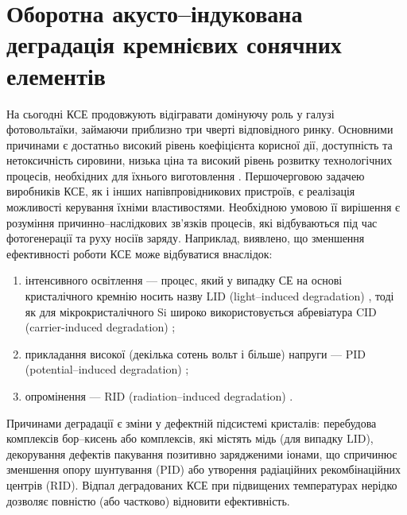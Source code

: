 \section{Оборотна акусто--індукована деградація кремнієвих сонячних \mbox{елементів}\label{USID}}

На сьогодні КСЕ продовжують відігравати домінуючу роль у галузі фотовольтаїки, займаючи приблизно три чверті відповідного ринку.
Основними причинами є достатньо високий рівень коефіцієнта корисної дії, доступність та нетоксичність сировини,
низька ціна та високий рівень розвитку технологічних процесів, необхідних для їхнього виготовлення \cite{Si:Hu}.
Першочерговою задачею виробників КСЕ, як і інших напівпровідникових пристроїв, є реалізація можливості керування їхніми властивостями.
Необхідною умовою її вирішення є розуміння причинно--наслідкових зв'язків процесів, які відбуваються під час фотогенерації та руху носіїв заряду.
Наприклад, виявлено, що зменшення ефективності роботи КСЕ може відбуватися внаслідок:
\begin{enumerate}[label=\asbuk*),leftmargin=0em,itemindent=1.5em]
  \item інтенсивного освітлення --- процес, який у випадку СЕ на основі кристалічного кремнію носить назву LID (light--induced degradation) \cite{LID:SchmidtJMR,LIDRev,LIDRev2,LID:JAP2017II}, тоді як для мікрокристалічного Si широко використовується абревіатура CID (carrier-induced degradation) \cite{CID:APL,CID:PPS};
  \item прикладання високої (декілька сотень вольт і більше) напруги --- PID  (potential--induced degradation) \cite{PID:SEMSC,PID:PP,PID:2017};
  \item опромінення ---  RID (radiation--induced degradation) \cite{Bhat,Karazhanov}.
\end{enumerate}
Причинами деградації є зміни у дефектній підсистемі кристалів:
перебудова комплексів бор--кисень або комплексів, які містять мідь (для випадку LID),
декорування дефектів пакування позитивно зарядженими іонами, що спричинює зменшення  опору шунтування (PID)
або утворення радіаційних рекомбінаційних центрів (RID).
Відпал деградованих КСЕ при підвищених температурах нерідко дозволяє повністю (або частково) відновити ефективність.

